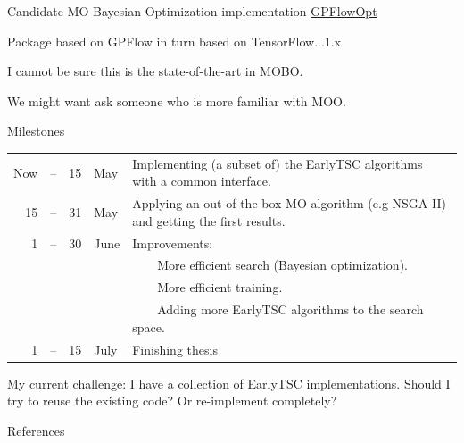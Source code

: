 \documentclass[t,11pt,aspectratio=169]{beamer}
\begin{document}
\begin{frame}[fragile]{Candidate MO Bayesian Optimization implementation}
\href{https://gpflowopt.readthedocs.io/en/latest/notebooks/multiobjective.html}{GPFlowOpt}

Package based on GPFlow in turn based on TensorFlow...\pause 1.x \pause

I cannot be sure this is the state-of-the-art in MOBO. \pause

We might want ask someone who is more familiar with MOO.

\end{frame}

\begin{frame}[fragile]{Milestones}
\begin{tabular}{>{\small}r@{\hskip3pt} >{\small}l@{\hskip3pt} >{\small}l@{\hskip3pt} >{\small}l p{11cm}}
      Now&--& 15 & May   & Implementing (a subset of) the EarlyTSC algorithms with a common interface.\\
      15&--&31 & May   & Applying an out-of-the-box MO algorithm (e.g NSGA-II) and getting the first results.\\
      1&--&30& June & Improvements:\\
      &&&& ~~\llap{\textbullet}~~More efficient search (Bayesian optimization).\\
      &&&& ~~\llap{\textbullet}~~More efficient training.\\
      &&&& ~~\llap{\textbullet}~~Adding more EarlyTSC algorithms to the search space.\\
      1&--&15& July & Finishing thesis \\
\end{tabular}
\vspace{.7cm}\pause

My current challenge: I have a collection of EarlyTSC implementations. Should I try to reuse the existing code? Or re-implement completely?
\end{frame}

\begin{frame}[allowframebreaks]{References}
    \footnotesize
    
    
\end{frame}
\end{document}
